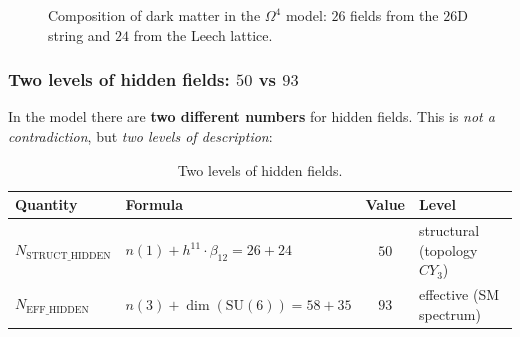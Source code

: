\documentclass[11pt,a4paper]{article}
\newcommand{\SU}{\mathrm{SU}}
\newcommand{\CY}{CY_3}
\newcommand{\Om}{\Omega^4}
\theoremstyle{definition}
\begin{document}
\begin{figure}[htbp]
\centering
{}
\caption{Composition of dark matter in the $\Om$ model: $26$ fields from the 
$26$D string and $24$ from the Leech lattice.}
\label{fig:dm-content}
\end{figure}

\subsubsection{Two levels of hidden fields: \texorpdfstring{$50$ vs $93$}{50 vs 93}}
\label{subsubsec:two-hidden-levels}

In the model there are \textbf{two different numbers} for hidden fields.
This is \emph{not a contradiction}, but \emph{two levels of description}:

\begin{table}[htbp]
\centering
\caption{Two levels of hidden fields.}
\label{tab:two-hidden-levels}
\begin{tabular}{llcl}
\toprule
Quantity & Formula & Value & Level \\
\midrule
$N_{\text{STRUCT\_HIDDEN}}$ & $n(1) + h^{11} \cdot \beta_{12} = 26 + 24$ & $50$ &
    structural (topology $\CY$) \\[0.3em]
$N_{\text{EFF\_HIDDEN}}$ & $n(3) + \dim(\SU(6)) = 58 + 35$ & $93$ &
    effective (SM spectrum) \\
\bottomrule
\end{tabular}
\end{table}
\end{document}

